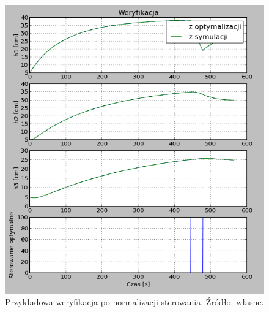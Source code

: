 \begin{figure}[htp]
    \centering
    \includegraphics{Grafika/plot_5_5_6-30_30_25-normalised-350}
    \caption{Przykładowa weryfikacja po normalizacji sterowania. Źródło: własne.}
    \label{fig:plot556-303035-normalised-350}
\end{figure}


